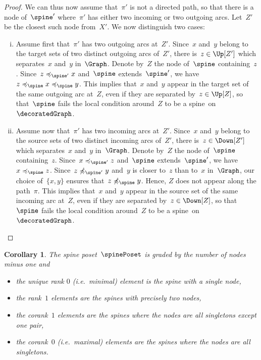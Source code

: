 \documentclass{amsart}
\newtheorem{corollary}[theorem]{Corollary}
\theoremstyle{definition}
\newcommand{\ie}{\textit{i.e.}~} %
\begin{document}
\begin{proof}
  We can thus now assume that~$\pi'$ is not a directed path, so that there is a node of~$\spine'$ where~$\pi'$ has either two incoming or two outgoing arcs.
  Let~$Z'$ be the closest such node from~$X'$.
  We now distinguish two cases:
  \begin{enumerate}[(i)]
    \item Assume first that~$\pi'$ has two outgoing arcs at~$Z'$.
    Since~$x$ and~$y$ belong to the target sets of two distinct outgoing arcs of~$Z'$, there is~$z \in \Up[Z']$ which separates~$x$ and~$y$ in~$\Graph$.
    Denote by~$Z$ the node of~$\spine$ containing~$z$.
    Since~$z \preccurlyeq_{\spine'} x$ and~$\spine$ extends~$\spine'$, we have~$z \preccurlyeq_{\spine} x \preccurlyeq_{\spine} y$.
    This implies that~$x$ and~$y$ appear in the target set of the same outgoing arc at~$Z$, even if they are separated by~$z \in \Up[Z]$, so that~$\spine$ fails the local condition around~$Z$ to be a spine~on~$\decoratedGraph$.
    \item Assume now that~$\pi'$ has two incoming arcs at~$Z'$.
    Since~$x$ and~$y$ belong to the source sets of two distinct incoming arcs of~$Z'$, there is~$z \in \Down[Z']$ which separates~$x$ and~$y$ in~$\Graph$.
    Denote by~$Z$ the node of~$\spine$ containing~$z$.
    Since~$x \preccurlyeq_{\spine'} z$ and~$\spine$ extends~$\spine'$, we have~$x \preccurlyeq_{\spine} z$.
    Since~$z \not\preccurlyeq_{\spine'} y$ and~$y$ is closer to~$z$ than to~$x$ in~$\Graph$, our choice of~$\{x,y\}$ ensures that~$z \not\preccurlyeq_{\spine} y$.
    Hence, $Z$ does not appear along the path~$\pi$.
    This implies that~$x$ and~$y$ appear in the source set of the same incoming arc at~$Z$, even if they are separated by~$z \in \Down[Z]$, so that~$\spine$ fails the local condition around~$Z$ to be a spine~on~$\decoratedGraph$.
    \qedhere
  \end{enumerate}
\end{proof}

\begin{corollary} 
  The spine poset~$\spinePoset$ is graded by the number of nodes minus one and
  \begin{itemize}
    \item the unique rank $0$ (\ie minimal) element is the spine with a single node, 
    \item the rank~$1$ elements are the spines with precisely two nodes, 
    \item the corank~$1$ elements are the spines where the nodes are all singletons except one pair,
    \item the corank~$0$ (\ie maximal) elements are the spines where the nodes are all singletons.
  \end{itemize}
\end{corollary}
\end{document}
